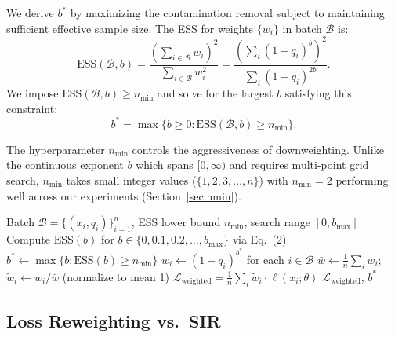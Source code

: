 \documentclass[11pt]{article}
\begin{document}
We derive $b^*$ by maximizing the contamination removal subject to maintaining sufficient effective sample size.
The ESS for weights $\{w_i\}$ in batch $\mathcal{B}$ is:
\begin{equation}
    \mathrm{ESS}(\mathcal{B}, b) = \frac{\left(\sum_{i \in \mathcal{B}} w_i\right)^2}{\sum_{i \in \mathcal{B}} w_i^2} = \frac{\left(\sum_{i} (1-q_i)^b\right)^2}{\sum_{i} (1-q_i)^{2b}}.
\end{equation}
We impose $\mathrm{ESS}(\mathcal{B}, b) \geq n_{\min}$ and solve for the largest $b$ satisfying this constraint:
\begin{equation}
    b^* = \max \{ b \geq 0 : \mathrm{ESS}(\mathcal{B}, b) \geq n_{\min} \}.
\end{equation}

The hyperparameter $n_{\min}$ controls the aggressiveness of downweighting.
Unlike the continuous exponent $b$ which spans $[0, \infty)$ and requires multi-point grid search, $n_{\min}$ takes small integer values ($\{1, 2, 3, \ldots, n\}$) with $n_{\min} = 2$ performing well across our experiments (Section~\ref{sec:nmin}).

\begin{algorithm}[t]
\caption{Adaptive $b^*$ with ESS Constraint}
\label{alg:adaptive}
\begin{algorithmic}[1]
\REQUIRE Batch $\mathcal{B} = \{(x_i, q_i)\}_{i=1}^n$, ESS lower bound $n_{\min}$, search range $[0, b_{\max}]$
\STATE Compute $\mathrm{ESS}(b)$ for $b \in \{0, 0.1, 0.2, \ldots, b_{\max}\}$ via Eq.~(2)
\STATE $b^* \leftarrow \max\{b : \mathrm{ESS}(b) \geq n_{\min}\}$
\STATE $w_i \leftarrow (1 - q_i)^{b^*}$ for each $i \in \mathcal{B}$
\STATE $\bar{w} \leftarrow \frac{1}{n}\sum_i w_i$; \quad $\tilde{w}_i \leftarrow w_i / \bar{w}$ \hfill (normalize to mean 1)
\STATE $\mathcal{L}_{\mathrm{weighted}} = \frac{1}{n}\sum_i \tilde{w}_i \cdot \ell(x_i; \theta)$
\RETURN $\mathcal{L}_{\mathrm{weighted}}$, $b^*$
\end{algorithmic}
\end{algorithm}

\subsection{Loss Reweighting vs.\ SIR}
\end{document}

